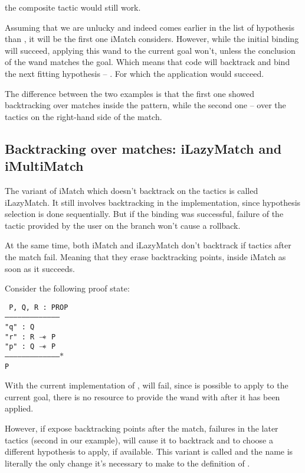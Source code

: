 the composite tactic  would still work.

Assuming that we are unlucky and  indeed comes earlier in the list of hypothesis than , it will be the first one iMatch considers.
However, while the initial binding will succeed, applying this wand to the current goal won't, unless the conclusion of the wand matches the goal.
Which means that code will backtrack and bind the next fitting hypothesis -- .
For which the application would succeed.

The difference between the two examples is that the first one showed backtracking over matches inside the pattern, while the second one -- over the tactics on the right-hand side of the match.

\subsection{Backtracking over matches: iLazyMatch and iMultiMatch}

The variant of iMatch which doesn't backtrack on the tactics is called iLazyMatch.
It still involves backtracking in the implementation, since hypothesis selection is done sequentially.
But if the binding was successful, failure of the tactic provided by the user on the branch won't cause a rollback.

At the same time, both iMatch and iLazyMatch don't backtrack if tactics after the match fail.
Meaning that they erase backtracking points, inside iMatch as soon as it succeeds.

Consider the following proof state:

\texttt{
P, Q, R : PROP\\
---------------------------------------\\
"q" : Q\\
"r" : R $\mathrel{-\mkern-6mu*}$ P\\
"p" : Q $\mathrel{-\mkern-6mu*}$ P\\
--------------------------------------$\ast$\\
P
}

With the current implementation of ,  will fail, since  is possible to apply to the current goal, there is no resource to provide the wand with after it has been applied.

However, if expose backtracking points after the match, failures in the later tactics (second  in our example), will cause it to backtrack and
to choose a different hypothesis to apply, if available.
This variant is called  and the name is literally the only change it's necessary to make to the definition of .

